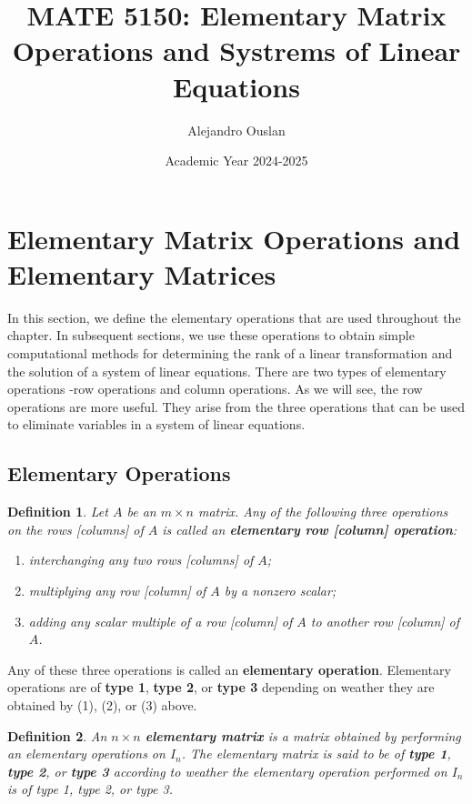 \documentclass[10pt, oneside]{article}
\title{MATE 5150: Elementary Matrix Operations and Systrems of Linear Equations}
\author{Alejandro Ouslan}
\date{Academic Year 2024-2025}
\newtheorem{defn}{Definition}
\begin{document}
\maketitle
\tableofcontents

\vspace{.25in}

\section{Elementary Matrix Operations and Elementary Matrices}

In this section, we define the elementary operations that are used throughout the chapter. In subsequent sections, we use these
operations to obtain simple computational methods for determining the rank of a linear transformation and the solution of a
system of linear equations. There are two types of elementary operations -row operations and column operations. As we will see,
the row operations are more useful. They arise from the three operations that can be used to eliminate variables in a system of linear equations.

\subsection{Elementary Operations}
\begin{defn}
	Let $A$ be an $m \times n$ matrix. Any of the following three operations on the rows [columns] of $A$ is called an \textbf{elementary row [column] operation}:
	\begin{enumerate}
		\item interchanging any two rows [columns] of $A$;
		\item multiplying any row [column] of $A$ by a nonzero scalar;
		\item adding any scalar multiple of a row [column] of $A$ to another row [column] of $A$.
	\end{enumerate}
\end{defn}

Any of these three operations is called an \textbf{elementary operation}. Elementary operations are of \textbf{type 1}, \textbf{type 2}, or \textbf{type 3} depending on
weather they are obtained by (1), (2), or (3) above.

\begin{defn}
	An $n \times n$ \textbf{elementary matrix} is a matrix obtained by performing an elementary operations on $I_n$. The elementary matrix is said to be of \textbf{type 1}, \textbf{type 2}, or \textbf{type 3}
	according to weather the elementary operation performed on $I_n$ is of type 1, type 2, or type 3.
\end{defn}
\end{document}
